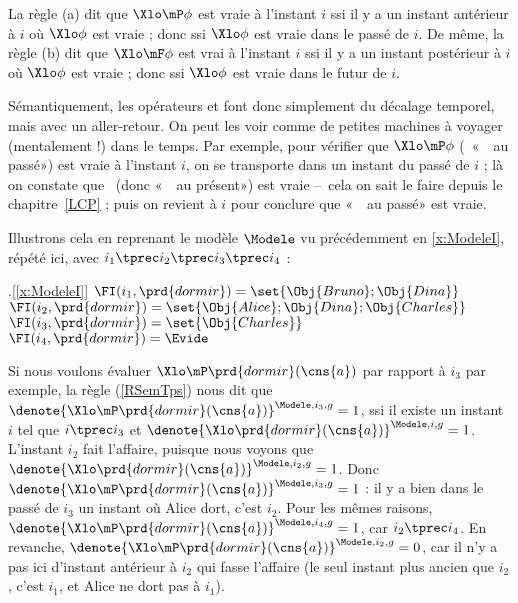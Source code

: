 La règle (a) dit que
$\Xlo\mP\phi$ %
est vraie à l'instant $i$ ssi il y a
un instant antérieur à $i$ 
où $\Xlo\phi$ est vraie ; donc ssi $\Xlo\phi$
est vraie dans le passé de $i$.
De même, la  règle (b) dit que $\Xlo\mF\phi$ %
est vrai à l'instant $i$ ssi il y a un instant postérieur à $i$ %
où $\Xlo\phi$ est vraie ; donc ssi $\Xlo\phi$ est vraie dans le futur 
de $i$.

Sémantiquement, les opérateurs {\mP} et {\mF} font donc simplement du décalage temporel, mais avec un aller-retour. On peut les voir comme de petites machines à voyager (mentalement !) dans le temps. Par exemple, pour vérifier que $\Xlo\mP\phi$ (\ie\ «~\vrb\phi\ au passé») est vraie à l'instant $i$, on se transporte dans un instant du passé de $i$ ; là on constate que \vrb\phi\ (donc «~\vrb\phi\ au présent») est vraie --~cela on sait le faire depuis le chapitre~\ref{LCP} ; puis on revient à $i$ pour conclure que «~\vrb\phi\ au passé» est vraie.

Illustrons cela en reprenant le modèle $\Modele$ vu précédemment en \ref{x:ModeleI}, répété ici, avec $i_1\tprec i_2 \tprec i_3\tprec i_4$ :

\ex.[\ref{x:ModeleI}]
\(
\FI(i_1,\prd{dormir}) = \set{\Obj{Bruno};\Obj{Dina}}
\)
\\
\(
\FI(i_2,\prd{dormir}) = \set{\Obj{Alice};\Obj{Dina};\Obj{Charles}}
\)
\\
\(
\FI(i_3,\prd{dormir}) = \set{\Obj{Charles}}
\)
\\
\(
\FI(i_4,\prd{dormir}) = \Evide
\)


\sloppy

Si nous voulons évaluer \(\Xlo\mP\prd{dormir}(\cns{a})\) par rapport à $i_3$ par exemple, la règle (\RSem\ref{RSemTps}) nous dit que \(\denote{\Xlo\mP
\prd{dormir}(\cns{a})}^{\Modele,i_3,g}=1\), ssi il existe un instant $i$ tel que
$i \tprec i_3$ et
\(\denote{\Xlo\prd{dormir}(\cns{a})}^{\Modele,i,g}=1\).
L'instant $i_2$ fait l'affaire, puisque nous voyons que \(\denote{\Xlo\prd{dormir}(\cns{a})}^{\Modele,i_2,g}=1\). Donc \(\denote{\Xlo\mP
\prd{dormir}(\cns{a})}^{\Modele,i_3,g}=1\) : il y a bien dans le passé de $i_3$ un instant où Alice dort, c'est $i_2$.
Pour les mêmes raisons, \(\denote{\Xlo\mP\prd{dormir}(\cns{a})}^{\Modele,i_4,g}=1\), car $i_2 \tprec i_4$.
En revanche, \(\denote{\Xlo\mP\prd{dormir}(\cns{a})}^{\Modele,i_2,g}=0\), car
il n'y a pas ici d'instant antérieur à $i_2$ qui fasse l'affaire (le
seul instant plus ancien que $i_2$, c'est $i_1$, et Alice ne dort pas à $i_1$).

